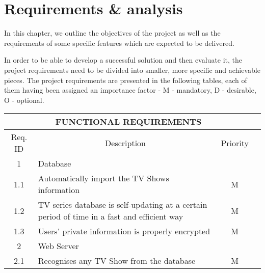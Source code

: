 \chapter{Requirements \& analysis}\label{3}

In this chapter, we outline the objectives of the project as well as the requirements of some specific features which are expected to be delivered.

In order to be able to develop a successful solution and then evaluate it, the project requirements need to be divided into smaller, more specific and achievable pieces. The project requirements are presented in the following tables, each of them having been assigned an importance factor - M - mandatory, D - desirable, O - optional.

\label{functional-requirements-table}
\begin{tabularx}{\textwidth}{|c|X|c|X|}
\caption{Functional requirements table}
 \hline
 \multicolumn{3}{|c|}{FUNCTIONAL REQUIREMENTS}                                                                                                                           \\ \hline
Req. ID & \multicolumn{1}{c|}{Description}                                                                                                                   & Priority \\ \hline
1       & \multicolumn{2}{l|}{Database}                                                                                                                                 \\ \hline
1.1     & Automatically import the TV Shows information                                                                                                      & M        \\ \hline
1.2     & TV series database is self-updating at a certain period of time in a fast and efficient way                                                        & M        \\ \hline
1.3     & Users' private information is properly encrypted                                                                                                   & M        \\ \hline
2       & \multicolumn{2}{l|}{Web Server}                                                                                                                               \\ \hline
2.1     & Recognises any TV Show from the database                                                                                                           & M        \\ \hline

\end{tabularx}
